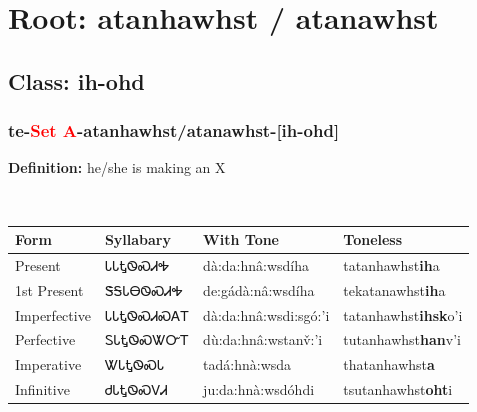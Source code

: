 \needspace{4in}
\section*{Root: atanhawhst / atanawhst}
\nopagebreak
{}
\needspace{3in}
\subsection*{Class: ih-ohd}
\nopagebreak
\needspace{2in}
\subsubsection*{te{-}\textcolor{Red}{Set A}{-}\textbf{atanhawhst/atanawhst}{-}[ih-ohd]}
\nopagebreak
\textbf{Definition: } he/she is making an X
\\[0.5em]
\begin{tabularx}{\textwidth}{l X X X}%
\toprule%
\textbf{Form}&\textbf{Syllabary}&\textbf{With Tone}&\textbf{Toneless}\\%
\midrule%
Present&ᏓᏓᎿᏫᏍᏗᎭ&dà:da:hnâ:wsdíha&tatanhawhst\textbf{ih}a\\%
1st Present&ᏕᎦᏓᎾᏫᏍᏗᎭ&de:gádà:nâ:wsdíha&tekatanawhst\textbf{ih}a\\%
Imperfective&ᏓᏓᎿᏫᏍᏗᏍᎪᎢ&dà:da:hnâ:wsdi:sgó:’i&tatanhawhst\textbf{ihsk}o'i\\%
Perfective&ᏚᏓᎿᏫᏍᏔᏅᎢ&dù:da:hnâ:wstanv̌:’i&tutanhawhst\textbf{han}v'i\\%
Imperative&ᏔᏓᎿᏫᏍᏓ&tadá:hnà:wsda&thatanhawhst\textbf{a}\\%
Infinitive&ᏧᏓᎿᏫᏍᏙᏗ&ju:da:hnà:wsdóhdi&tsutanhawhst\textbf{oht}i\\%
\bottomrule%
\end{tabularx}
\\[1em]